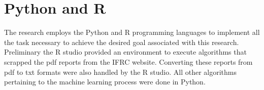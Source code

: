 \section{Python and R}
The research employs the Python and R programming languages to implement all the task necessary to achieve the desired goal associated with this research. Preliminary the R studio provided an environment to execute algorithms that scrapped the pdf reports from the IFRC website. Converting these reports from pdf to txt formats were also handled by the R studio. 
All other algorithms pertaining to the machine learning process were done in Python.
%
%
%
%
%
%
%
%
%
%
%
%
